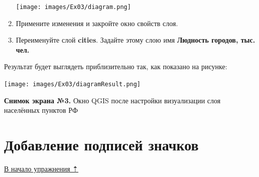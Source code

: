 \documentclass[
  12pt,
]{book}
\begin{document}
\begin{enumerate}
  \texttt{[image: images/Ex03/diagram.png]}
\item
  Примените изменения и закройте окно свойств слоя.
\item
  Переименуйте слой \textbf{cities}. Задайте этому слою имя \textbf{Людность городов, тыс. чел.}
\end{enumerate}

Результат будет выглядеть приблизительно так, как показано на рисунке:

\texttt{[image: images/Ex03/diagramResult.png]}

\textbf{Снимок экрана №3.} Окно QGIS после настройки визуализации слоя населённых пунктов РФ

\hypertarget{map-design-population-labels}{%
\section{Добавление подписей значков}\label{map-design-population-labels}}

\protect\hyperlink{map-design-population}{В начало упражнения ⇡}
\end{document}
